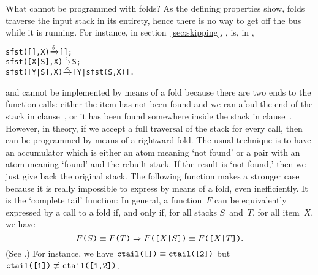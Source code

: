 What cannot be programmed with folds? As the defining properties show,
folds traverse the input stack in its entirety, hence there is no way
to get off the bus while it is running. For instance,  in
section~\ref{sec:skipping}, , is, in \Erlang,
\begin{alltt}
sfst(   [],X) \(\smashedrightarrow{\theta}\) [];
sfst([X|S],X) \(\smashedrightarrow{\iota}\) S;
sfst([Y|S],X) \(\smashedrightarrow{\kappa}\) [Y|sfst(S,X)].
\end{alltt}
and cannot be implemented by means of a fold because there are two
ends to the function calls: either the item has not been found and we
ran afoul the end of the stack in clause~\clause{\theta}, or it has
been found somewhere inside the stack in
clause~\clause{\iota}. However, in theory, if we accept a full
traversal of the stack for every call, then  can be
programmed by means of a rightward fold. The usual technique is to
have an accumulator which is either an atom meaning `not found' or a
pair with an atom meaning `found' and the rebuilt stack. If the result
is `not found,' then we just give back the original stack. The
following function makes a stronger case because it is really
impossible to express by means of a fold, even inefficiently. It is
the `complete tail' function:\label{code:ctail}
 In general, a function~\(F\) can be
equivalently expressed by a call to a fold if, and only if, for all
stacks \(S\)~and~\(T\), for all item~\(X\), we have
\begin{equation*}
\texttt{\(F\)(\(S\))} \equiv \texttt{\(F\)(\(T\))}
\Rightarrow
\texttt{\(F\)([\(X\)|\(S\)])}
\equiv
\texttt{\(F\)([\(X\)|\(T\)])}.
\end{equation*}
(See \cite{GibbonsHuttonAltenkirch_2001,WeberCaldwell_2004}.) For
instance, we have \(\texttt{ctail([])} \equiv
\texttt{ctail([2])}\) but \(\texttt{ctail([1])} \mathrel{\not\equiv}
\texttt{ctail([1,2])}\).

